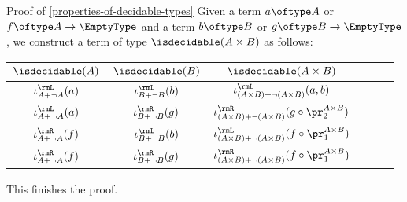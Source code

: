 \begin{Proof}{Proof of \cref{properties-of-decidable-types}}
    Given a term $a\oftype A$ or $f\oftype A\to\EmptyType$ and a term $b\oftype B$ or $g\oftype B\to\EmptyType$, we construct a term of type $\isdecidable(A\times B)$ as follows:
    \begingroup%
    \renewcommand{\arraystretch}{1.2}
    \begin{center}
        \begin{tabular}{|Sc|Sc|Sc|}\hline{}
            $\isdecidable(A)$            & $\isdecidable(B)$            & $\isdecidable(A\times B)$                                               \\\hline{}
            $\iota^{\rmL}_{A+\neg A}(a)$ & $\iota^{\rmL}_{B+\neg B}(b)$ & $\iota^{\rmL}_{(A\times B)+\neg(A\times B)}(a,b)$                       \\
            $\iota^{\rmL}_{A+\neg A}(a)$ & $\iota^{\rmR}_{B+\neg B}(g)$ & $\iota^{\rmR}_{(A\times B)+\neg(A\times B)}(g\circ\pr^{A\times B}_{2})$ \\
            $\iota^{\rmR}_{A+\neg A}(f)$ & $\iota^{\rmL}_{B+\neg B}(b)$ & $\iota^{\rmL}_{(A\times B)+\neg(A\times B)}(f\circ\pr^{A\times B}_{1})$ \\
            $\iota^{\rmR}_{A+\neg A}(f)$ & $\iota^{\rmR}_{B+\neg B}(g)$ & $\iota^{\rmR}_{(A\times B)+\neg(A\times B)}(f\circ\pr^{A\times B}_{1})$ \\\hline
        \end{tabular}
    \end{center}
    \endgroup
    This finishes the proof.


\end{Proof}
